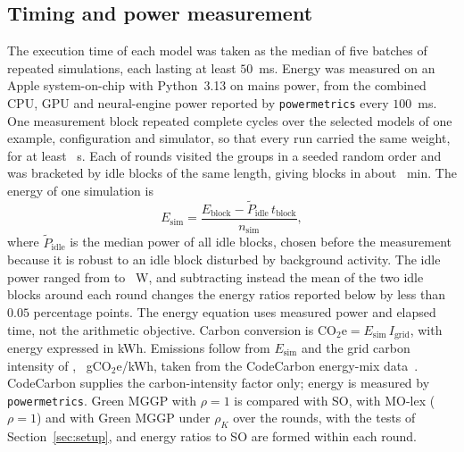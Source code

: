 \subsection{Timing and power measurement}
The execution time of each model was taken as the median of five batches of repeated simulations, each lasting at
least $50$~ms. Energy was measured on an Apple \enChip{} system-on-chip with Python~3.13 on mains power, from the
combined CPU, GPU and neural-engine power reported by \texttt{powermetrics} every $100$~ms. One measurement block
repeated complete cycles over the selected models of one example, configuration and simulator, so that every run
carried the same weight, for at least \enBlockS~s. Each of \enRounds{} rounds visited the \enNGroups{} groups in a
seeded random order and was bracketed by idle blocks of the same length, giving \enNBlocks{} blocks in about
\enDuration~min. The energy of one simulation is
\begin{equation}
E_\mathrm{sim}=\frac{E_\mathrm{block}-\tilde P_\mathrm{idle}\,t_\mathrm{block}}{n_\mathrm{sim}},
\label{eq:esim}
\end{equation}
where $\tilde P_\mathrm{idle}$ is the median power of all idle blocks, chosen before the measurement because it is
robust to an idle block disturbed by background activity. The idle power ranged from \enIdleMinW{} to
\enIdleMaxW~W, and subtracting instead the mean of the two idle blocks around each round changes the energy ratios
reported below by less than $0.05$ percentage points. The energy equation uses measured power and elapsed time, not the arithmetic objective. Carbon conversion is $\mathrm{CO_2e}=E_{\mathrm{sim}}\,I_{\mathrm{grid}}$, with energy expressed in kWh. Emissions follow from $E_\mathrm{sim}$ and the grid carbon
intensity of \enCountry{}, \enCI{}~gCO$_2$e/kWh, taken from the CodeCarbon energy-mix data~\cite{codecarbon}. CodeCarbon supplies the carbon-intensity factor only; energy is measured by \texttt{powermetrics}. Green
MGGP with $\rho=1$ is compared with SO, with MO-lex ($\rho=1$) and with Green MGGP under $\rho_K$ over the rounds, with
the tests of Section~\ref{sec:setup}, and energy ratios to SO are formed within each round.

